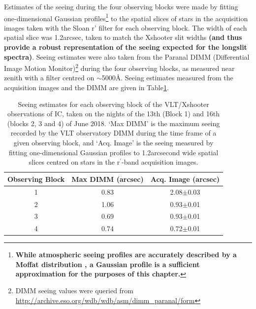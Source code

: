 Estimates of the seeing during the four observing blocks were made by fitting one-dimensional Gaussian profiles\footnote{\textbf{While atmospheric seeing profiles are accurately described by a Moffat distribution \citep{Moffat1969}, a Gaussian profile is a sufficient approximation for the purposes of this chapter.}} to the spatial slices of stars in the acquisition images taken with the Sloan r' filter for each observing block. The width of each spatial slice was 1.2\;arcsec, taken to match the Xshooter slit widths \textbf{(and thus provide a robust representation of the seeing expected for the longslit spectra)}. Seeing estimates were also taken from the Paranal DIMM (Differential Image Motion Monitor)\footnote{DIMM seeing values were queried from \url{http://archive.eso.org/wdb/wdb/asm/dimm_paranal/form}} during the four observing blocks, as measured near zenith with a filter centred on $\sim$5000\;\AA. Seeing estimates measured from the acquisition images and the DIMM are given in Table\;\ref{tab: observations_and_data_reduction: xshooter_ic_5063: seeing: seeing}.

\begin{table}
    \centering
    {\renewcommand{\arraystretch}{2}
    \setlength{\tabcolsep}{20pt}
    \begin{tabular}{ccc}
    Observing Block & {Max DIMM (arcsec)} & Acq. Image (arcsec) \\ \hline
    1               & 0.83                                                         & 2.08$\pm$0.03                                                  \\
    2               & 1.06                                                         & 0.93$\pm$0.01                                           \\
    3               & 0.69                                                         & 0.93$\pm$0.01                                               \\
    4               & 0.74                                                         & 0.72$\pm$0.01                                              
    \end{tabular}
    }
    \caption[Seeing estimates for the VLT/Xshooter observations of IC.]{Seeing estimates for each observing block of the VLT/Xshooter observations of IC, taken on the nights of the 13th (Block 1) and 16th (blocks 2, 3 and 4) of June 2018. `Max DIMM' is the maximum seeing recorded by the VLT observatory DIMM during the time frame of a given observing block, and `Acq. Image' is the seeing measured by fitting one-dimensional Gaussian profiles to 1.2\;arcsecond wide spatial slices centred on stars in the r$^\prime$-band acquisition images.}
    \label{tab: observations_and_data_reduction: xshooter_ic_5063: seeing: seeing}
\end{table}


